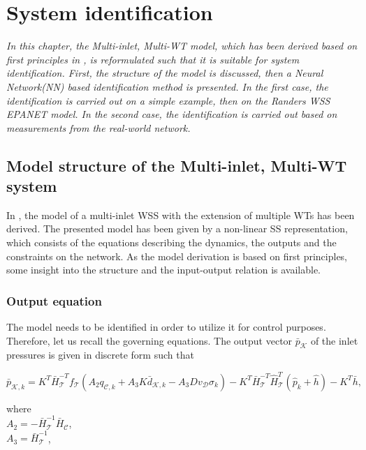 \chapter{System identification}
\label{identification_design}

\emph{In this chapter, the Multi-inlet, Multi-WT model, which has been derived based on first principles in , is reformulated such that it is suitable for system identification. First, the structure of the model is discussed, then a Neural Network(NN) based identification method is presented. In the first case, the identification is carried out on a simple example, then on the Randers WSS EPANET model. In the second case, the identification is carried out based on measurements from the real-world network.}

\section{Model structure of the Multi-inlet, Multi-WT system}
\label{model_structure_of_the_multi_inlet_multi_WT_system}

In , the model of a multi-inlet WSS with the extension of multiple WTs has been derived. The presented model has been given by a non-linear SS representation, which consists of the equations describing the dynamics, the outputs and the constraints on the network. As the model derivation is based on first principles, some insight into the structure and the input-output relation is available. 

\subsection{Output equation}
\label{output_eq_identification}

The model needs to be identified in order to utilize it for control purposes. Therefore, let us recall the governing equations. The output vector $\bar{p}_{\mathcal{K}}$ of the inlet pressures is given in discrete form such that

\begin{equation}
  \label{recall_output_eq}
  \bar{p}_{\mathcal{K},k} = K^T \bar{H}^{-T}_{\mathcal{T}}f_{\mathcal{T}}(A_2 q_{\mathcal{C},k} + A_3 K \bar{d}_{\mathcal{K},k} - A_3 D v_{\mathcal{D}} \sigma_k) - K^T\bar{H}^{-T}_{\mathcal{T}}\hat{H}^{T}_{\mathcal{T}} (\hat{p}_k + \hat{h}) - K^T\bar{h} ,
\end{equation} 

\begin{minipage}[t]{0.4\textwidth}
where\\
\hspace*{8mm} $A_2 = -\bar{H}^{-1}_{\mathcal{T}} \bar{H}_{\mathcal{C}} $, \vspace*{1.5mm}\\
\hspace*{8mm} $A_3 = \bar{H}^{-1}_{\mathcal{T}}$,
\end{minipage}

